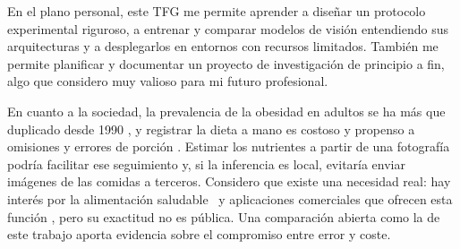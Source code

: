 En el plano personal, este TFG me permite aprender a diseñar un protocolo
experimental riguroso, a entrenar y comparar modelos de visión entendiendo sus
arquitecturas y a desplegarlos en entornos con recursos limitados. También me
permite planificar y documentar un proyecto de investigación de principio a
fin, algo que considero muy valioso para mi futuro profesional.

En cuanto a la sociedad, la prevalencia de la obesidad en adultos se ha más que
duplicado desde 1990 \citep{ObesityOverweight}, y registrar la dieta a mano es
costoso y propenso a omisiones y errores de porción
\citep{whittonSystematicReviewExamining2022}. Estimar los nutrientes a partir
de una fotografía podría facilitar ese seguimiento y, si la inferencia es
local, evitaría enviar imágenes de las comidas a terceros. Considero que existe
una necesidad real: hay interés por la alimentación saludable~\citep{2025EurobarometerFood2025}
y aplicaciones comerciales que ofrecen esta
función \citep{HowUseMeal2026,Healthify,CalAIFood}, pero su exactitud no es
pública. Una comparación abierta como la de este trabajo aporta evidencia sobre
el compromiso entre error y coste.

\endgroup
